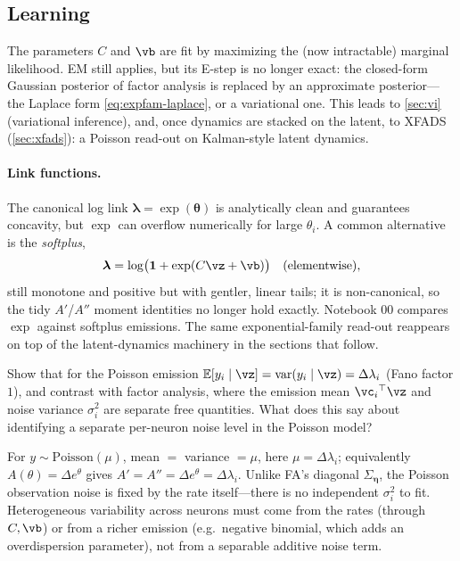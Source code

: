 \documentclass[11pt]{article}
\theoremstyle{plain}
\theoremstyle{definition}
\theoremstyle{remark}
\theoremstyle{definition}
\newcommand{\E}{\mathbb{E}}
\newcommand{\veta}{\bm{\eta}}
\begin{document}
\subsection{Learning}

The parameters $C$ and $\vb$ are fit by maximizing the (now intractable) marginal
likelihood. EM still applies, but its E-step is no longer exact: the closed-form
Gaussian posterior of factor analysis is replaced by an approximate posterior---
the Laplace form \eqref{eq:expfam-laplace}, or a variational one. This leads to
\cref{sec:vi} (variational inference), and, once dynamics are stacked on the
latent, to XFADS (\cref{sec:xfads}): a Poisson read-out on Kalman-style latent
dynamics.

\paragraph{Link functions.} The canonical log link $\bm{\lambda} =
\exp(\bm{\theta})$ is analytically clean and guarantees concavity, but $\exp$ can
overflow numerically for large $\theta_i$. A common alternative is the
\emph{softplus},
\begin{equation}\label{eq:expfam-softplus}
    \bm{\lambda} = \log\!\big(\mathbf 1 + \exp(C\vz + \vb)\big) \quad\text{(elementwise)},
\end{equation}
still monotone and positive but with gentler, linear tails; it is non-canonical,
so the tidy $A'$/$A''$ moment identities no longer hold exactly. Notebook 00
compares $\exp$ against softplus emissions. The same
exponential-family read-out reappears on top of the latent-dynamics machinery in
the sections that follow.

\begin{exercise}\label{ex:poisson-noise}
Show that for the Poisson emission $\E[y_i\mid\vz] = \var(y_i\mid\vz) =
\Delta\lambda_i$ (Fano factor $1$), and contrast with factor analysis, where the
emission mean $\vc_i\trp\vz$ and noise variance $\sigma_i^2$ are separate free
quantities. What does this say about identifying a separate per-neuron noise level
in the Poisson model?
\end{exercise}
\begin{solution}
For $y\sim\mathrm{Poisson}(\mu)$, mean $=$ variance $= \mu$, here $\mu =
\Delta\lambda_i$; equivalently $A(\theta) = \Delta e^{\theta}$ gives $A' = A'' =
\Delta e^{\theta} = \Delta\lambda_i$. Unlike FA's diagonal $\Sigma_{\veta}$, the
Poisson observation noise is fixed by the rate itself---there is no independent
$\sigma_i^2$ to fit.
Heterogeneous variability across neurons must come from the rates (through $C,
\vb$) or from a richer emission (e.g.\ negative binomial, which adds an
overdispersion parameter), not from a separable additive noise term.
\end{solution}
\end{document}
